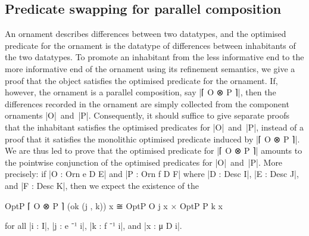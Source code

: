 \subsection{Predicate swapping for parallel composition}
\label{sec:predicate-swapping}

An ornament describes differences between two datatypes, and the optimised predicate for the ornament is the datatype of differences between inhabitants of the two datatypes.
To promote an inhabitant from the less informative end to the more informative end of the ornament using its refinement semantics, we give a proof that the object satisfies the optimised predicate for the ornament.
If, however, the ornament is a parallel composition, say |⌈ O ⊗ P ⌉|, then the differences recorded in the ornament are simply collected from the component ornaments |O|~and~|P|.
Consequently, it should suffice to give separate proofs that the inhabitant satisfies the optimised predicates for |O|~and~|P|, instead of a proof that it satisfies the monolithic optimised predicate induced by |⌈ O ⊗ P ⌉|.
We are thus led to prove that the optimised predicate for |⌈ O ⊗ P ⌉| amounts to the pointwise conjunction of the optimised predicates for |O|~and~|P|.
More precisely: if |O : Orn e D E| and |P : Orn f D F| where |D : Desc I|, |E : Desc J|, and |F : Desc K|, then we expect the existence of the 
\begin{code}
OptP ⌈ O ⊗ P ⌉ (ok (j , k)) x ≅ OptP O j x × OptP P k x
\end{code}
for all |i : I|, |j : e ⁻¹ i|, |k : f ⁻¹ i|, and |x : μ D i|.


